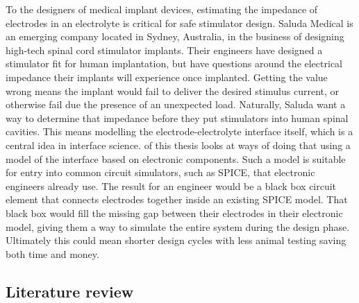   To the designers of medical implant devices, estimating the impedance of electrodes in an electrolyte is critical for safe stimulator design.
  Saluda Medical is an emerging company located in Sydney, Australia, in the business of designing high-tech spinal cord stimulator implants.
  Their engineers have designed a stimulator fit for human implantation, but have questions around the electrical impedance their implants will experience once implanted.
  Getting the value wrong means the implant would fail to deliver the desired stimulus current, or otherwise fail due the presence of an unexpected load.
  Naturally, Saluda want a way to determine that impedance before they put stimulators into human spinal cavities.
  This means modelling the electrode-electrolyte interface itself, which is a central idea in interface science.
   of this thesis looks at ways of doing that using a model of the interface based on electronic components.
  Such a model is suitable for entry into common circuit simulators, such as SPICE, that electronic engineers already use.
  The result for an engineer would be a black box circuit element that connects electrodes together inside an existing SPICE model.
  That black box would fill the missing gap between their electrodes in their electronic model, giving them a way to simulate the entire system during the design phase.
  Ultimately this could mean shorter design cycles with less animal testing saving both time and money.

  \subsection{Literature review}

